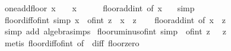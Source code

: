 \begin{isabellebody}
\endisatagproof
{\isafoldproof}%
%
\isadelimproof
\isanewline
%
\endisadelimproof
\isanewline
{}\isamarkupfalse%
\ one{\isacharunderscore}{\kern0pt}add{\isacharunderscore}{\kern0pt}floor{\isacharcolon}{\kern0pt}\ {\isachardoublequoteopen}{\isasymlfloor}x{\isasymrfloor}\ {\isacharplus}{\kern0pt}\ {}\ {\isacharequal}{\kern0pt}\ {\isasymlfloor}x\ {\isacharplus}{\kern0pt}\ {}{\isasymrfloor}{\isachardoublequoteclose}\isanewline
%
\isadelimproof
\ \ %
\endisadelimproof
%
\isatagproof
{}\isamarkupfalse%
\ floor{\isacharunderscore}{\kern0pt}add{\isacharunderscore}{\kern0pt}int\ {\isacharbrackleft}{\kern0pt}of\ x\ {}{\isacharbrackright}{\kern0pt}\ \isamarkupfalse%
\ simp%
\endisatagproof
{\isafoldproof}%
%
\isadelimproof
\isanewline
%
\endisadelimproof
\isanewline
{}\isamarkupfalse%
\ floor{\isacharunderscore}{\kern0pt}diff{\isacharunderscore}{\kern0pt}of{\isacharunderscore}{\kern0pt}int\ {\isacharbrackleft}{\kern0pt}simp{\isacharbrackright}{\kern0pt}{\isacharcolon}{\kern0pt}\ {\isachardoublequoteopen}{\isasymlfloor}x\ {\isacharminus}{\kern0pt}\ of{\isacharunderscore}{\kern0pt}int\ z{\isasymrfloor}\ {\isacharequal}{\kern0pt}\ {\isasymlfloor}x{\isasymrfloor}\ {\isacharminus}{\kern0pt}\ z{\isachardoublequoteclose}\isanewline
%
\isadelimproof
\ \ %
\endisadelimproof
%
\isatagproof
{}\isamarkupfalse%
\ floor{\isacharunderscore}{\kern0pt}add{\isacharunderscore}{\kern0pt}int\ {\isacharbrackleft}{\kern0pt}of\ x\ {\isachardoublequoteopen}{\isacharminus}{\kern0pt}\ z{\isachardoublequoteclose}{\isacharbrackright}{\kern0pt}\ \isamarkupfalse%
\ {\isacharparenleft}{\kern0pt}simp\ add{\isacharcolon}{\kern0pt}\ algebra{\isacharunderscore}{\kern0pt}simps{\isacharparenright}{\kern0pt}%
\endisatagproof
{\isafoldproof}%
%
\isadelimproof
\isanewline
%
\endisadelimproof
\isanewline
{}\isamarkupfalse%
\ floor{\isacharunderscore}{\kern0pt}uminus{\isacharunderscore}{\kern0pt}of{\isacharunderscore}{\kern0pt}int\ {\isacharbrackleft}{\kern0pt}simp{\isacharbrackright}{\kern0pt}{\isacharcolon}{\kern0pt}\ {\isachardoublequoteopen}{\isasymlfloor}{\isacharminus}{\kern0pt}\ {\isacharparenleft}{\kern0pt}of{\isacharunderscore}{\kern0pt}int\ z{\isacharparenright}{\kern0pt}{\isasymrfloor}\ {\isacharequal}{\kern0pt}\ {\isacharminus}{\kern0pt}\ z{\isachardoublequoteclose}\isanewline
%
\isadelimproof
\ \ %
\endisadelimproof
%
\isatagproof
{}\isamarkupfalse%
\ {\isacharparenleft}{\kern0pt}metis\ floor{\isacharunderscore}{\kern0pt}diff{\isacharunderscore}{\kern0pt}of{\isacharunderscore}{\kern0pt}int\ {\isacharbrackleft}{\kern0pt}of\ {}{\isacharbrackright}{\kern0pt}\ diff{\isacharunderscore}{\kern0pt}{}\ floor{\isacharunderscore}{\kern0pt}zero{\isacharparenright}{\kern0pt}%

\end{isabellebody}
